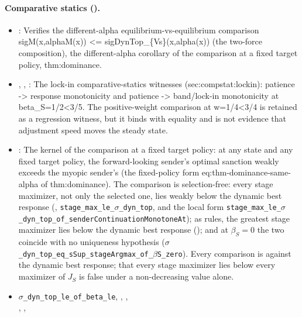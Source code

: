 \paragraph{Comparative statics ().}
\begin{itemize}[leftmargin=1.4em,itemsep=1pt]
\item {}: Verifies the different-alpha equilibrium-vs-equilibrium comparison sigM(x,alphaM(x)) \textless{}= sigDynTop\_\{Vs\}(x,alpha(x)) (the two-force composition), the different-alpha corollary of the comparison at a fixed target policy, thm:dominance.
\item {}, , : The lock-in comparative-statics witnesses (sec:compstat:lockin): patience -\textgreater{} response monotonicity and patience -\textgreater{} band/lock-in monotonicity at beta\_S=1/2\textless{}3/5.  The positive-weight comparison at w=1/4\textless{}3/4 is retained as a regression witness, but it binds with equality and is not evidence that adjustment speed moves the steady state.
\item {}: The kernel of the comparison at a fixed target policy: at any state and any fixed target policy, the forward-looking sender's optimal sanction weakly exceeds the myopic sender's (the fixed-policy form eq:thm-dominance-same-alpha of thm:dominance). The comparison is selection-free: every stage maximizer, not only the selected one, lies weakly below the dynamic best response (, \texttt{stage\_max\_le\_$\sigma$\_dyn\_top}, and the local form \texttt{stage\_max\_le\_$\sigma$\_dyn\_top\_of\_senderContinuationMonotoneAt}); as rules, the greatest stage maximizer lies below the dynamic best response (); and at $\beta_S=0$ the two coincide with no uniqueness hypothesis (\texttt{$\sigma$\_dyn\_top\_eq\_sSup\_stageArgmax\_of\_$\beta$S\_zero}). Every comparison is against the dynamic best response; that every stage maximizer lies below every maximizer of $J_S$ is false under a non-decreasing value alone.
\item \texttt{$\sigma$\_dyn\_top\_le\_of\_beta\_le},
,
,\\
,
,\\

\end{itemize}
